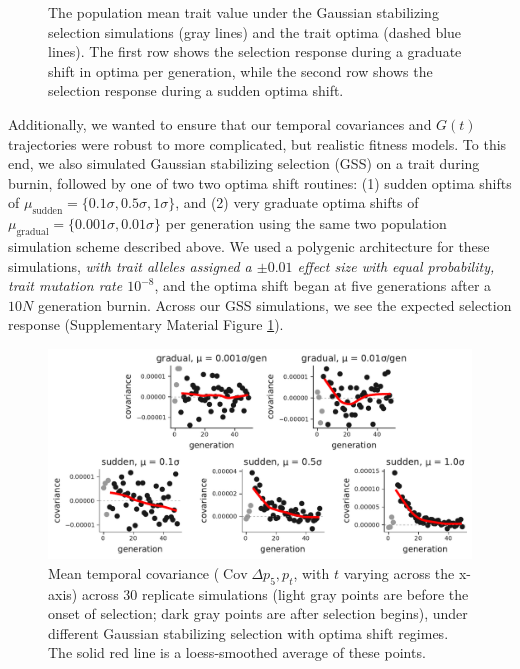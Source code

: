 \documentclass[11pt]{article}
\newcommand{\vb}[1]{{\it \color{blue} #1}}
\DeclareMathOperator{\cov}{Cov}
\begin{document}
{\begin{figure}[!ht]
  \caption{The population mean trait value under the Gaussian stabilizing
  selection simulations (gray lines) and the trait optima (dashed blue lines).
  The first row shows the selection response during a graduate shift in optima
  per generation, while the second row shows the selection response during a
  sudden optima shift.}

  \label{suppfig:gss-zbar}
\end{figure}

Additionally, we wanted to ensure that our temporal covariances and $G(t)$
trajectories were robust to more complicated, but realistic fitness models. To
this end, we also simulated Gaussian stabilizing selection (GSS) on a trait
during burnin, followed by one of two two optima shift routines: (1) sudden
optima shifts of $\mu_\text{sudden} = \{0.1\sigma, 0.5\sigma, 1\sigma\}$, and
(2) very graduate optima shifts of $\mu_\text{gradual} = \{0.001\sigma,
0.01\sigma\}$ per generation using the same two population simulation scheme
described above.  We used a polygenic architecture for these simulations,
\vb{with trait alleles assigned a $\pm 0.01$ effect size with equal
probability, trait mutation rate $10^{-8}$}, and the optima shift began at five
generations after a $10N$ generation burnin. Across our GSS simulations, we
see the expected selection response (Supplementary Material Figure
\ref{suppfig:gss-zbar}).

\begin{figure}[!ht]
  \centering
  \includegraphics[width=\textwidth]{figures/gss-covs.pdf}

  \caption{Mean temporal covariance ($\cov \Delta p_5, p_t$, with $t$ varying
    across the x-axis) across 30 replicate simulations (light gray points are
    before the onset of selection; dark gray points are after selection
    begins), under different Gaussian stabilizing selection with optima shift
  regimes. The solid red line is a loess-smoothed average of these points.}


\end{figure}}
\end{document}
